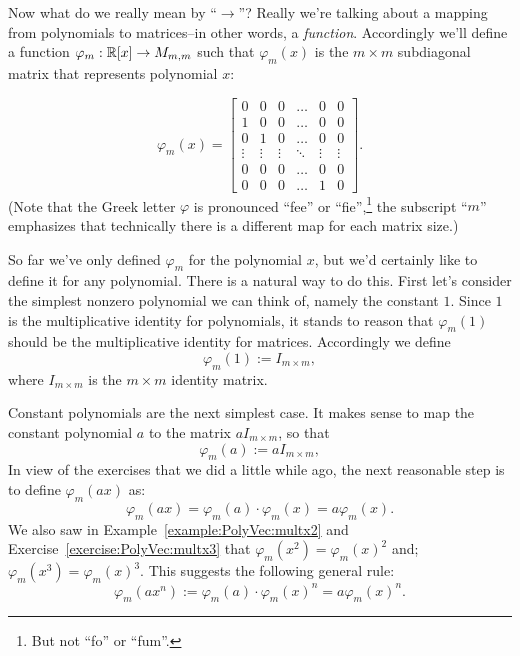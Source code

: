 Now what do we really mean by ``$\rightarrow$''? Really we're talking about a mapping from polynomials to matrices--in other words, a \emph{function}. Accordingly we'll define a function  $\varphi_m: \mathbb{R}[x] \rightarrow M_{m,m}$ such that $\varphi_m(x)$ is the $m\times m$  subdiagonal matrix that represents polynomial $x$:

\[\varphi_m(x) = \left[\begin{array}{cccccc}0 & 0 & 0 & \hdots & 0 & 0\\1 & 0 & 0 & \hdots & 0 & 0\\0 & 1 & 0 & \hdots & 0 & 0\\\vdots & \vdots & \vdots & \ddots & \vdots & \vdots\\0 & 0 & 0 & \hdots & 0 & 0\\0 & 0 & 0 & \hdots & 1 & 0\end{array}\right].\]
\noindent
(Note that the Greek letter $\varphi$ is pronounced ``fee'' or ``fie'',\footnote{But not ``fo'' or ``fum''.}  the subscript ``$m$'' emphasizes that technically there is a different map for each matrix size.)

So far we've only defined $\varphi_m$ for the polynomial $x$, but we'd certainly like to define it for any polynomial. There is a natural way to do this. First let's consider the simplest nonzero polynomial we can think of, namely the constant $1$.  Since $1$ is the multiplicative identity for polynomials, it stands to reason that $\varphi_m(1)$ should be the multiplicative identity for matrices.  Accordingly we define
\[ \varphi_m(1) := I_{m \times m},\]
where  $I_{m \times m}$ is the $m \times m$ identity matrix. 

Constant polynomials are the next simplest case. It makes sense to map the constant polynomial $a$ to the matrix $aI_{m \times m}$, so that
\[ \varphi_m(a) := aI_{m \times m},\]
In view of the exercises that we did a little while ago, the next reasonable step is to define $\varphi_m(ax)$ as:
\[  \varphi_m(ax) = \varphi_m(a) \cdot \varphi_m(x) = a \varphi_m(x). \]
We also saw in Example~\ref{example:PolyVec:multx2} and Exercise~\ref{exercise:PolyVec:multx3} that $ \varphi_m(x^2) = \varphi_m(x)^2$ and; $\varphi_m(x^3) =   \varphi_m(x)^3$. This suggests the following general rule:
\[ \varphi_m(ax^n) :=   \varphi_m(a) \cdot \varphi_m(x)^n =   a\varphi_m(x)^n. \]

